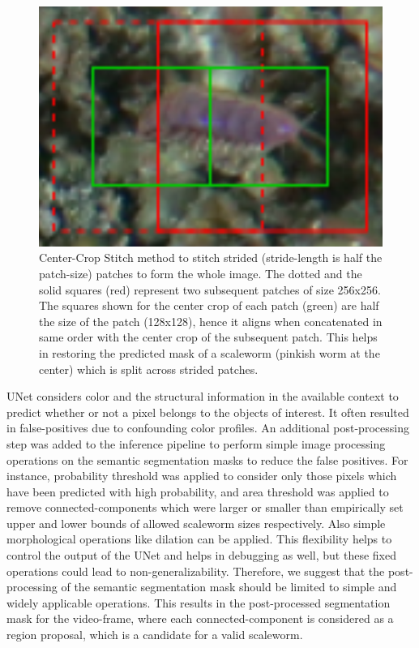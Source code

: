 \documentclass[10pt,twocolumn,letterpaper]{article}
\begin{document}
\begin{figure}[t]
\begin{center}
   \includegraphics[width=0.8\linewidth]{center_crop_stitch.png}
\end{center}
   \caption{Center-Crop Stitch method to stitch strided (stride-length is half the patch-size) patches to form the whole image. The dotted and the solid squares (red) represent two subsequent patches of size 256x256. The squares shown for the center crop of each patch (green) are half the size of the patch (128x128), hence it aligns when concatenated in same order with the center crop of the subsequent patch. This helps in restoring the predicted mask of a scaleworm (pinkish worm at the center) which is split across strided patches.}
\label{fig:long}
\label{fig:centercropstitch}
\end{figure}

UNet \cite{unet} considers color and the structural information in the available context to predict whether or not a pixel belongs to the objects of interest. It often resulted in false-positives due to confounding color profiles. An additional post-processing step was added to the inference pipeline to perform simple image processing operations on the semantic segmentation masks to reduce the false positives. For instance, probability threshold was applied to consider only those pixels which have been predicted with high probability, and area threshold was applied to remove connected-components which were larger or smaller than empirically set upper and lower bounds of allowed scaleworm sizes respectively. Also simple morphological operations like dilation can be applied. This flexibility helps to control the output of the UNet and helps in debugging as well, but these fixed operations could lead to non-generalizability. Therefore, we suggest that the post-processing of the semantic segmentation mask should be limited to simple and widely applicable operations. This results in the post-processed segmentation mask for the video-frame, where each connected-component is considered as a region proposal, which is a candidate for a valid scaleworm.
\end{document}
